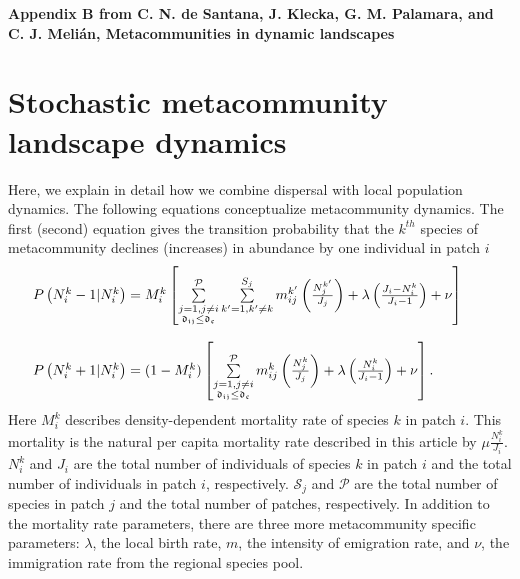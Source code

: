 \documentclass[12pt]{article}
\begin{document}
\clearpage
\begin{flushleft} 
{\Large \textbf{Appendix B from C. N. de Santana, J. Klecka, G. M. Palamara, and C. J. Meli\'{a}n, Metacommunities in dynamic landscapes}}
\end{flushleft}

\renewcommand{\theequation}{B-\arabic{equation}}
\setcounter{equation}{0}
\renewcommand{\thesection}{B\arabic{section}}
\renewcommand{\thefigure}{B\arabic{figure}}
\renewcommand{\thetable}{B\arabic{table}}
\setcounter{figure}{0}
\setcounter{table}{0}

\section*{Stochastic metacommunity landscape dynamics}
\label{Population dispersal model}

Here, we explain in detail how we combine dispersal with local
population dynamics. The following equations conceptualize
metacommunity dynamics. The first (second) equation gives the
transition probability that the $k^{th}$ species of
metacommunity declines (increases) in abundance by one individual in
patch $i$
\begin{equation}
\begin{array}{lcr}
\hspace{-0.25 in}P \left(N_{i}^{k} - 1 | N_{i}^{k} \right) = M^{k}_{i} \left[\sum\limits^{\mathcal{P}}_{\substack{j = 1,j \ne i \\ \mathfrak{d_{ij}} \leq \mathfrak{d_{c}}}}
 \sum\limits_{k'=1,k'\ne k}^{S_{j}} m_{ij}^{k'} \left(\frac{N_{j}^{k'}}{J_{j}}\right) + \lambda \left(\frac{J_{i} - N_{i}^{k}}{J_{i} - 1}\right) + \nu \right]\\[0.5cm]
\\
\hspace{-0.25 in}P \left(N_{i}^{k} + 1 | N_{i}^{k}\right) = (1 - M^{k}_{i}) \left[
\sum\limits^{\mathcal{P}}_{\substack{j = 1,j \ne i \\ \mathfrak{d_{ij}} \leq \mathfrak{d_{c}}}}
 m_{ij}^{k} \left(\frac{N_{j}^{k}}{J_{j}}\right) + \lambda \left(\frac{N_{i}^{k}}{J_{i} - 1}\right) + \nu \right].
\end{array}
\label{master}
\end{equation}
Here $M^{k}_{i}$ describes density-dependent mortality rate of species
$k$ in patch $i$. This mortality is the natural per capita mortality
rate described in this article by $\mu
\frac{N_{i}^{k}}{J_{i}}$. $N_{i}^{k}$ and $J_{i}$ are the total number of
individuals of species $k$ in patch $i$ and the total number of individuals
in patch $i$, respectively. $\mathcal{S}_{j}$ and $\mathcal{P}$ are
the total number of species in patch $j$ and the total number of
patches, respectively. In addition to the mortality rate parameters,
there are three more metacommunity specific parameters: $\lambda$, the
local birth rate, $m$, the intensity of emigration rate, and $\nu$,
the immigration rate from the regional species pool.
\end{document}
